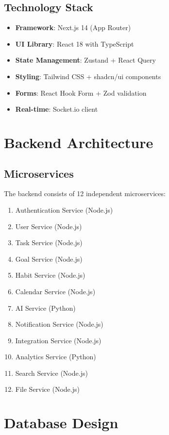 \subsection{Technology Stack}

\begin{itemize}
    \item \textbf{Framework}: Next.js 14 (App Router)
    \item \textbf{UI Library}: React 18 with TypeScript
    \item \textbf{State Management}: Zustand + React Query
    \item \textbf{Styling}: Tailwind CSS + shadcn/ui components
    \item \textbf{Forms}: React Hook Form + Zod validation
    \item \textbf{Real-time}: Socket.io client
\end{itemize}

\section{Backend Architecture}

\subsection{Microservices}

The backend consists of 12 independent microservices:

\begin{enumerate}
    \item Authentication Service (Node.js)
    \item User Service (Node.js)
    \item Task Service (Node.js)
    \item Goal Service (Node.js)
    \item Habit Service (Node.js)
    \item Calendar Service (Node.js)
    \item AI Service (Python)
    \item Notification Service (Node.js)
    \item Integration Service (Node.js)
    \item Analytics Service (Python)
    \item Search Service (Node.js)
    \item File Service (Node.js)
\end{enumerate}

\section{Database Design}

